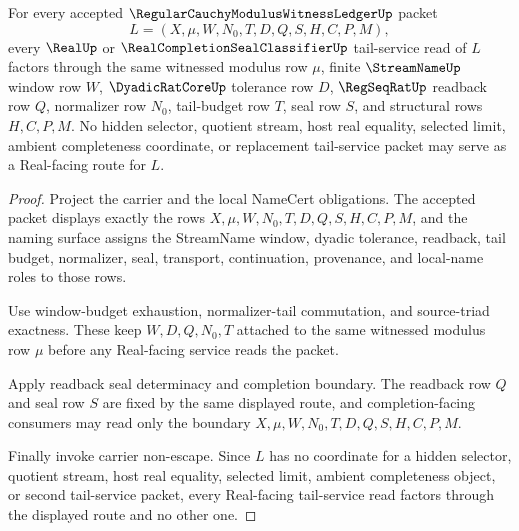 \begin{theorem}
\label{thm:regular-cauchy-modulus-witness-ledger-tail-service-exactness}
For every accepted $\RegularCauchyModulusWitnessLedgerUp$ packet
$$
L=(X,\mu,W,N_0,T,D,Q,S,H,C,P,M),
$$
every $\RealUp$ or $\RealCompletionSealClassifierUp$ tail-service read of $L$ factors through the same witnessed modulus row $\mu$, finite $\StreamNameUp$ window row $W$, $\DyadicRatCoreUp$ tolerance row $D$, $\RegSeqRatUp$ readback row $Q$, normalizer row $N_0$, tail-budget row $T$, seal row $S$, and structural rows $H,C,P,M$. No hidden selector, quotient stream, host real equality, selected limit, ambient completeness coordinate, or replacement tail-service packet may serve as a Real-facing route for $L$.
\end{theorem}
\begin{proof}
Project the carrier and the local NameCert obligations. The accepted packet displays exactly the rows $X,\mu,W,N_0,T,D,Q,S,H,C,P,M$, and the naming surface assigns the StreamName window, dyadic tolerance, readback, tail budget, normalizer, seal, transport, continuation, provenance, and local-name roles to those rows.

Use window-budget exhaustion, normalizer-tail commutation, and source-triad exactness. These keep $W,D,Q,N_0,T$ attached to the same witnessed modulus row $\mu$ before any Real-facing service reads the packet.

Apply readback seal determinacy and completion boundary. The readback row $Q$ and seal row $S$ are fixed by the same displayed route, and completion-facing consumers may read only the boundary $X,\mu,W,N_0,T,D,Q,S,H,C,P,M$.

Finally invoke carrier non-escape. Since $L$ has no coordinate for a hidden selector, quotient stream, host real equality, selected limit, ambient completeness object, or second tail-service packet, every Real-facing tail-service read factors through the displayed route and no other one.
\end{proof}

